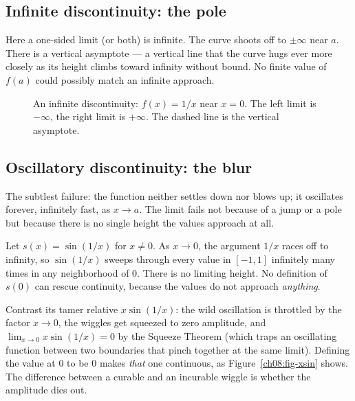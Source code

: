 \subsection{Infinite discontinuity: the pole}

Here a one-sided limit (or both) is infinite. The curve shoots off to $\pm\infty$ near
$a$. There is a vertical asymptote --- a vertical line that the curve hugs ever more
closely as its height climbs toward infinity without bound. No finite value of $f(a)$
could possibly match an infinite approach.

\begin{figure}[htbp]
\centering
{}
\caption{An infinite discontinuity: $f(x)=1/x$ near $x=0$. The left limit is $-\infty$,
the right limit is $+\infty$. The dashed line is the vertical asymptote.}
\label{ch08:fig-infinite}
\end{figure}

\subsection{Oscillatory discontinuity: the blur}

The subtlest failure: the function neither settles down nor blows up; it oscillates
forever, infinitely fast, as $x\to a$. The limit fails not because of a jump or a pole but
because there is no single height the values approach at all.

\begin{example}
\label{ch08:ex-osc}
Let $s(x)=\sin(1/x)$ for $x\ne 0$. As $x\to 0$, the argument $1/x$ races off to infinity,
so $\sin(1/x)$ sweeps through every value in $[-1,1]$ infinitely many times in any
neighborhood of $0$. There is no limiting height. No definition of $s(0)$ can rescue
continuity, because the values do not approach \emph{anything}.

Contrast its tamer relative $x\sin(1/x)$: the wild oscillation is throttled by the factor
$x\to 0$, the wiggles get squeezed to zero amplitude, and $\lim_{x\to 0}x\sin(1/x)=0$ by
the Squeeze Theorem (which traps an oscillating function between two boundaries that pinch
together at the same limit). Defining the value at $0$ to be $0$ makes \emph{that} one
continuous, as Figure~\ref{ch08:fig-xsin} shows. The difference between
a curable and an incurable wiggle is whether the amplitude dies out.
\end{example}

